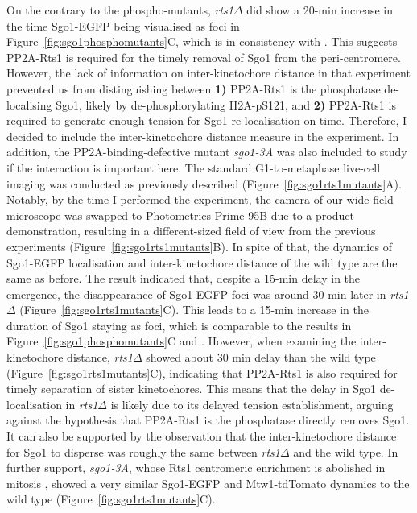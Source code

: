 On the contrary to the phospho-mutants, \textit{rts1$\Delta$} did show a 20-\si{\minute} increase in the time Sgo1-EGFP being visualised as foci in Figure~\ref{fig:sgo1phosphomutants}C, which is in consistency with \cite{Nerusheva2014}. This suggests PP2A-Rts1 is required for the timely removal of Sgo1 from the peri-centromere. However, the lack of information on inter-kinetochore distance in that experiment prevented us from distinguishing between \textbf{1)} PP2A-Rts1 is the phosphatase de-localising Sgo1, likely by de-phosphorylating H2A-pS121, and \textbf{2)} PP2A-Rts1 is required to generate enough tension for Sgo1 re-localisation on time. Therefore, I decided to include the inter-kinetochore distance measure in the experiment. In addition, the PP2A-binding-defective mutant \textit{sgo1-3A} was also included to study if the interaction is important here. The standard G1-to-metaphase live-cell imaging was conducted as previously described (Figure~\ref{fig:sgo1rts1mutants}A). Notably, by the time I performed the experiment, the camera of our wide-field microscope was swapped to Photometrics Prime 95B due to a product demonstration, resulting in a different-sized field of view from the previous experiments (Figure~\ref{fig:sgo1rts1mutants}B). In spite of that, the dynamics of Sgo1-EGFP localisation and inter-kinetochore distance of the wild type are the same as before. The result indicated that, despite a 15-\si{\minute} delay in the emergence, the disappearance of Sgo1-EGFP foci was around 30 \si{\minute} later in \textit{rts1$\Delta$} (Figure~\ref{fig:sgo1rts1mutants}C). This leads to a 15-\si{\minute} increase in the duration of Sgo1 staying as foci, which is comparable to the results in Figure~\ref{fig:sgo1phosphomutants}C and \cite{Nerusheva2014}. However, when examining the inter-kinetochore distance, \textit{rts1$\Delta$} showed about 30 \si{\minute} delay than the wild type (Figure~\ref{fig:sgo1rts1mutants}C), indicating that PP2A-Rts1 is also required for timely separation of sister kinetochores. This means that the delay in Sgo1 de-localisation in \textit{rts1$\Delta$} is likely due to its delayed tension establishment, arguing against the hypothesis that PP2A-Rts1 is the phosphatase directly removes Sgo1. It can also be supported by the observation that the inter-kinetochore distance for Sgo1 to disperse was roughly the same between \textit{rts1$\Delta$} and the wild type. In further support, \textit{sgo1-3A}, whose Rts1 centromeric enrichment is abolished in mitosis \citep{Eshleman2014}, showed a very similar Sgo1-EGFP and Mtw1-tdTomato dynamics to the wild type (Figure~\ref{fig:sgo1rts1mutants}C). 

